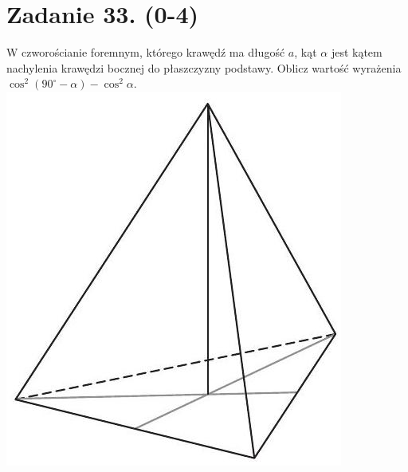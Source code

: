 \documentclass[10pt]{article}
\begin{document}
\section*{Zadanie 33. (0-4)}
W czworościanie foremnym, którego krawędź ma długość \(a\), kąt \(\alpha\) jest kątem nachylenia krawędzi bocznej do płaszczyzny podstawy. Oblicz wartość wyrażenia \(\cos ^{2}\left(90^{\circ}-\alpha\right)-\cos ^{2} \alpha\).\\
\includegraphics[max width=\textwidth, center]{2024_11_21_4a1915d79134dda0750eg-19}
\end{document}
